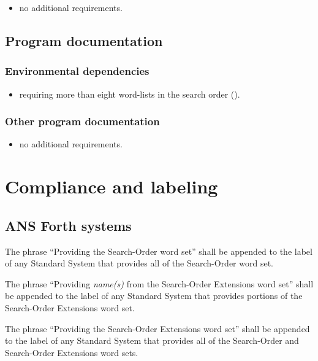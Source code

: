 \begin{itemize}
\item no additional requirements.
\end{itemize}

\subsection{Program documentation} %

\subsubsection{Environmental dependencies} %

\begin{itemize}
\item requiring more than eight word-lists in the search order
	().
\end{itemize}

\subsubsection{Other program documentation} %

\begin{itemize}
\item no additional requirements.
\end{itemize}


\section{Compliance and labeling} %

\cbstart{}
\subsection[Forth systems]{ANS Forth systems} %
\cbend

The phrase ``Providing the Search-Order word set'' shall be
appended to the label of any Standard System that provides all of
the Search-Order word set.

The phrase ``Providing \emph{name(s)} from the Search-Order
Extensions word set'' shall be appended to the label of any
Standard System that provides portions of the Search-Order
Extensions word set.

The phrase ``Providing the Search-Order Extensions word set'' shall
be appended to the label of any Standard System that provides all of
the Search-Order and Search-Order Extensions word sets.

